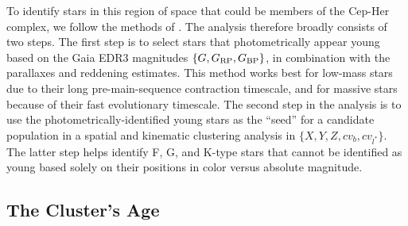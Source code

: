 \documentclass[12pt,twocolumn,linenumbers]{aastex63}
\begin{document}

To identify stars in this region of space that could be members of the
Cep-Her complex, we follow the methods of \citet{Kerr2021}.  The
analysis therefore broadly consists of two steps.  The first step is
to select stars that photometrically appear young based on the Gaia
EDR3 magnitudes $\{G, G_{\rm RP}, G_{\rm BP}\}$, in combination with
the parallaxes and reddening estimates.  This method works best for
low-mass stars due to their long pre-main-sequence contraction
timescale, and for massive stars because of their fast evolutionary
timescale.  The second step in the analysis is to use the
photometrically-identified young stars as the ``seed'' for a candidate
population in a spatial and kinematic clustering analysis in $\{ X, Y,
Z, c v_b, c v_{l^*} \} $.  The latter step helps identify F, G, and
K-type stars that cannot be identified as young based solely on their
positions in color versus absolute magnitude.




\subsection{The Cluster's Age}
\label{sec:clusterage}
\end{document}
